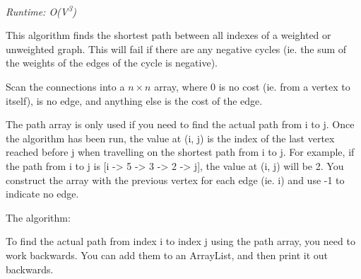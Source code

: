 
\textit{Runtime: O(V\textsuperscript{3})}

This algorithm finds the shortest path between all indexes of a weighted or unweighted graph. This will fail if there are any negative cycles (ie. the sum of the weights of the edges of the cycle is negative).

Scan the connections into a $n \times n$  array, where 0 is no cost (ie. from a vertex to itself),  is no edge, and anything else is the cost of the edge.

The path array is only used if you need to find the actual path from i to j. Once the algorithm has been run, the value at (i, j) is the index of the last vertex reached before j when travelling on the shortest path from i to j. For example, if the path from i to j is [i -> 5 -> 3 -> 2 -> j], the value at (i, j) will be 2. You construct the array with the previous vertex for each edge (ie. i) and use -1 to indicate no edge.



The algorithm:



To find the actual path from index i to index j using the path array, you need to work backwards. You can add them to an ArrayList, and then print it out backwards.



\newpage